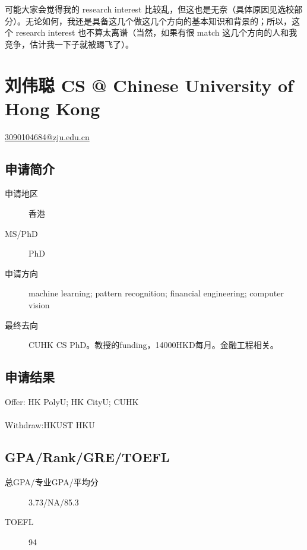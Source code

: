 \documentclass[11pt,fleqn,openany]{book} %
\begin{document}
可能大家会觉得我的 research interest 比较乱，但这也是无奈（具体原因见选校部分）。无论如何，我还是具备这几个做这几个方向的基本知识和背景的；所以，这个 research interest 也不算太离谱（当然，如果有很 match 这几个方向的人和我竞争，估计我一下子就被踢飞了）。
\clearpage
\section{刘伟聪 CS @ Chinese University of Hong Kong}
\hfill \href{mailto:3090104684@zju.edu.cn}{3090104684@zju.edu.cn}

\noindent\begin{minipage}[t]{0.45\textwidth}
\subsection*{申请简介}
\begin{description}
\item[申请地区] 香港
\item[MS/PhD] PhD
\item[申请方向] machine learning; pattern recognition; financial engineering; computer vision
\item[最终去向] CUHK CS PhD。教授的funding，14000HKD每月。金融工程相关。
\end{description}
\end{minipage}
\hfill
\begin{minipage}[t]{0.45\textwidth}
\subsection*{申请结果}
\noindent Offer: HK PolyU; HK CityU; CUHK\\
\\
Withdraw:HKUST HKU
\end{minipage}
\subsection*{GPA/Rank/GRE/TOEFL}
\begin{description}
\item[总GPA/专业GPA/平均分] 3.73/NA/85.3
\item[TOEFL] 94
\end{description}
\end{document}

